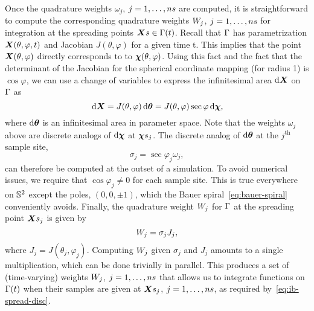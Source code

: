 Once the quadrature weights $\omega_j$, $j=1, \ldots, \sample\cardinality$ are computed, it is straightforward to
compute the corresponding quadrature weights $\weight[j]$, $j=1, \ldots, \sample\cardinality$ for integration at
the spreading points $\sample\X \in \interface(t)$. Recall that $\Gamma$ has parametrization
$\boldsymbol{X}(\theta, \varphi, t)$ and Jacobian $J(\theta, \varphi)$ for a given time t. This implies that the point
$\boldsymbol{X}(\theta, \varphi)$ directly corresponds to to $\boldsymbol{\chi}(\theta, \varphi)$. Using this fact and the fact that the
determinant of the Jacobian for the spherical coordinate mapping (for radius 1) is $\cos\varphi$, we can use a
change of variables to express the infinitesimal area $\d\X$ on $\Gamma$ as
\begin{equation}\label{eq:quad-cov}
    \d\X
    = J(\theta, \varphi)\d\qs
    = J(\theta, \varphi)\sec\varphi\d\Xp,
\end{equation}
where $\d\qs$ is an infinitesimal area in parameter space. Note that the weights $\omega_j$ above are discrete
analogs of $\d\Xp$ at $\Xpsj$. The discrete analog of $\d\qs$ at the $j^\text{th}$ sample site,
\begin{equation}
    \sigma_j=\sec\varphi_j\omega_j,
\end{equation}
can therefore be computed at the outset of a simulation. To avoid numerical issues, we require that
$\cos\varphi_j \neq 0$ for each sample site. This is true everywhere on $\mathbb{S}^2$ except the poles,
$(0, 0, \pm1)$, which the Bauer spiral~\eqref{eq:bauer-spiral} conveniently avoids. Finally, the quadrature weight
$\weight[j]$ for $\Gamma$ at the spreading point $\Xsj$ is given by
\begin{equation}
    \weight[j] = \sigma_j J_j,
\end{equation}
where $J_j = J(\theta_j, \varphi_j)$. Computing $\weight[j]$ given $\sigma_j$ and $J_j$ amounts to a single
multiplication, which can be done trivially in parallel. This produces a set of (time-varying) weights
$\weight[j]$, $j=1, \ldots, \sample\cardinality$ that allows us to integrate functions on $\Gamma(t)$ when
their samples are given at $\Xsj$, $j=1, \ldots, \sample\cardinality$, as required by~\eqref{eq:ib-spread-disc}.
